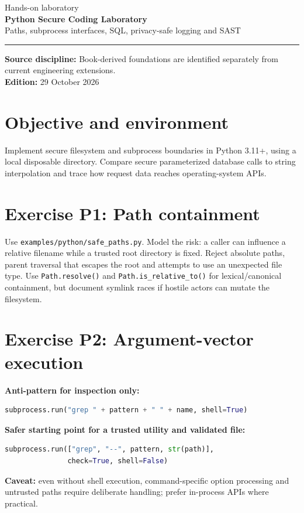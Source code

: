 \documentclass[10pt,letterpaper]{article}
\begin{document}
\hypersetup{pageanchor=false}%
\begin{titlepage}
\vspace*{1.0in}
{\color{bluegray}\Large Hands-on laboratory}\\[1.0em]
{\color{navy}\Huge\bfseries Python Secure Coding Laboratory}\\[0.7em]
{\Large Paths, subprocess interfaces, SQL, privacy-safe logging and SAST}\\[2.0em]
\rule{\linewidth}{1.0pt}
\vfill
\textbf{Source discipline:} Book-derived foundations are identified separately from current engineering extensions.\\
\textbf{Edition:} 29 October 2026
\end{titlepage}\hypersetup{pageanchor=true}
\tableofcontents
\clearpage
\section{Objective and environment}
Implement secure filesystem and subprocess boundaries in Python 3.11+, using a local disposable directory. Compare secure parameterized database calls to string interpolation and trace how request data reaches operating-system APIs.
\section{Exercise P1: Path containment}
Use \texttt{examples/python/safe\_paths.py}. Model the risk: a caller can influence a relative filename while a trusted root directory is fixed. Reject absolute paths, parent traversal that escapes the root and attempts to use an unexpected file type. Use \texttt{Path.resolve()} and \texttt{Path.is\_relative\_to()} for lexical/canonical containment, but document symlink races if hostile actors can mutate the filesystem.
\section{Exercise P2: Argument-vector execution}
\textbf{Anti-pattern for inspection only:}
\begin{lstlisting}[language=Python]
subprocess.run("grep " + pattern + " " + name, shell=True)
\end{lstlisting}
\textbf{Safer starting point for a trusted utility and validated file:}
\begin{lstlisting}[language=Python]
subprocess.run(["grep", "--", pattern, str(path)],
               check=True, shell=False)
\end{lstlisting}
\textbf{Caveat:} even without shell execution, command-specific option processing and untrusted paths require deliberate handling; prefer in-process APIs where practical.
\end{document}
